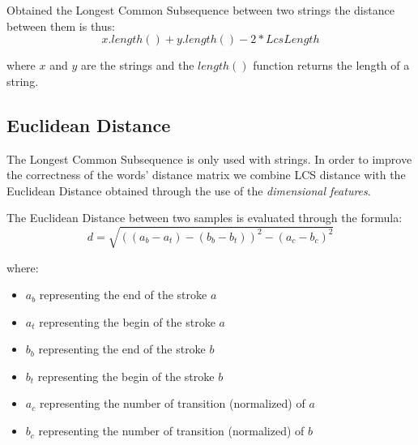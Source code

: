 Obtained the Longest Common Subsequence between two strings the distance between them is thus:
$$ x.length() + y.length() - 2*LcsLength$$

where $x$ and $y$ are the strings and the $length()$ function returns the length of a string.

\subsection{Euclidean Distance} 

The Longest Common Subsequence is only used with strings. In order to improve the correctness of the words' distance matrix we combine LCS distance with the Euclidean Distance obtained through the use of the \textit{dimensional features}.

The Euclidean Distance between two samples is evaluated through the formula:
$$d = \sqrt{((a_b - a_t)−(b_b - b_t))^2 -(a_c - b_c)^2}$$

where:
\begin{itemize}
\item $a_b$ representing the end of the stroke $a$
\item $a_t$ representing the begin of the stroke $a$
\item $b_b$ representing the end of the stroke $b$
\item $b_t$ representing the begin of the stroke $b$
\item $a_c$ representing the number of transition (normalized) of $a$
\item $b_c$ representing the number of transition (normalized) of $b$
\end{itemize}
